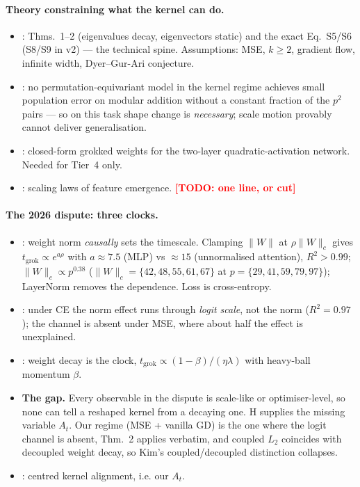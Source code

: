 \documentclass[a4paper,11pt]{article} %
\newcommand{\TODO}[1]{\textcolor{red}{\textbf{[TODO: #1]}}}
\newcommand{\tgrok}{t_{\mathrm{grok}}}
\begin{document}
\paragraph{Theory constraining what the kernel can do.}
\begin{itemize}
	\item \citet{lewkowycz2020l2}: Thms.~1--2 (eigenvalues decay, eigenvectors
		static) and the exact Eq.~S5/S6 (S8/S9 in v2) --- the technical spine.
		Assumptions: MSE, $k\ge2$, gradient flow, infinite width, Dyer--Gur-Ari
		conjecture.
	\item \citet{mohamadi2024grok}: no permutation-equivariant model in the kernel
		regime achieves small population error on modular addition without a
		constant fraction of the $p^2$ pairs --- so on this task shape change is
		\emph{necessary}; scale motion provably cannot deliver generalisation.
	\item \citet{gromov2023grokking}: closed-form grokked weights for the
		two-layer quadratic-activation network. Needed for Tier~4 only.
	\item \citet{tian2025emergence}: scaling laws of feature emergence.
		\TODO{one line, or cut}
\end{itemize}

\paragraph{The 2026 dispute: three clocks.}
\begin{itemize}
	\item \citet{truong2026norm}: weight norm \emph{causally} sets the timescale.
		Clamping $\lVert W\rVert$ at $\rho\lVert W\rVert_c$ gives
		$\tgrok\propto e^{a\rho}$ with $a\approx7.5$ (MLP) vs $\approx15$
		(unnormalised attention), $R^2>0.99$; $\lVert W\rVert_c\propto p^{0.38}$
		($\lVert W\rVert_c=\{42,48,55,61,67\}$ at $p=\{29,41,59,79,97\}$);
		LayerNorm removes the dependence. Loss is cross-entropy.
	\item \citet{truong2026logit}: under CE the norm effect runs through
		\emph{logit scale}, not the norm ($R^2=0.97$); the channel is absent under
		MSE, where about half the effect is unexplained.
	\item \citet{kim2026clock}: weight decay is the clock,
		$\tgrok\propto(1-\beta)/(\eta\lambda)$ with heavy-ball momentum $\beta$.
	\item \textbf{The gap.} Every observable in the dispute is scale-like or
		optimiser-level, so none can tell a reshaped kernel from a decaying one.
		H supplies the missing variable $A_t$. Our regime (MSE + vanilla GD) is the
		one where the logit channel is absent, Thm.~2 applies verbatim, and coupled
		$L_2$ coincides with decoupled weight decay, so Kim's coupled/decoupled
		distinction collapses.
	\item \citet{cortes2012alignment}: centred kernel alignment, i.e. our $A_t$.

\end{itemize}
\end{document}
